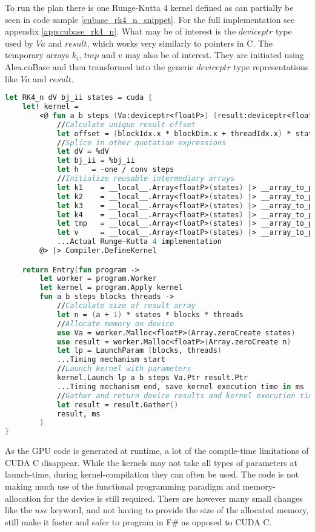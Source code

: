 To run the plan there is one Runge-Kutta 4 kernel defined as can partially be seen in code sample \ref{cubase_rk4_n_snippet}. 
For the full implementation see appendix \ref{app:cubase_rk4_n}. 
What may be of interest is the $deviceptr$ type used by $Va$ and $result$, which works very similarly to pointers in C.
The temporary arrays $k_i$, $tmp$ and $v$ may also be of interest. 
They are initiated using Alea.cuBase and then transformed into the generic $deviceptr$ type representations like $Va$ and $result$.
\clearpage
\begin{lstlisting}[language=FSharp, caption=The Runge-Kutta 4 solver expressed in F\# Alea.cuBase, label=cubase_rk4_n_snippet]
let RK4_n dV bj_ii states = cuda {
	let! kernel =
		<@ fun a b steps (Va:deviceptr<floatP>) (result:deviceptr<floatP>) ->
			//Calculate unique result offset
			let offset = (blockIdx.x * blockDim.x + threadIdx.x) * states * (a + 1)
            //Splice in other quotation expressions
			let dV = %dV
			let bj_ii = %bj_ii
			let h   = -one / conv steps
			//Initialize reusable intermediary arrays
			let k1	  = __local__.Array<floatP>(states) |> __array_to_ptr
			let k2	  = __local__.Array<floatP>(states) |> __array_to_ptr
			let k3	  = __local__.Array<floatP>(states) |> __array_to_ptr
			let k4	  = __local__.Array<floatP>(states) |> __array_to_ptr
			let tmp	  = __local__.Array<floatP>(states) |> __array_to_ptr
			let v	  = __local__.Array<floatP>(states) |> __array_to_ptr
            ...Actual Runge-Kutta 4 implementation
        @> |> Compiler.DefineKernel 

    return Entry(fun program ->
        let worker = program.Worker
        let kernel = program.Apply kernel
        fun a b steps blocks threads ->
            //Calculate size of result array
            let n = (a + 1) * states * blocks * threads
            //Allocate memory on device
            use Va = worker.Malloc<floatP>(Array.zeroCreate states)
            use result = worker.Malloc<floatP>(Array.zeroCreate n)
            let lp = LaunchParam (blocks, threads)
            ...Timing mechanism start
            //Launch kernel with parameters
            kernel.Launch lp a b steps Va.Ptr result.Ptr
            ...Timing mechanism end, save kernel execution time in ms
            //Gather and return device results and kernel execution time
            let result = result.Gather()
            result, ms
        )
}
\end{lstlisting}

As the GPU code is generated at runtime, a lot of the compile-time limitations of CUDA C disappear.
While the kernels may not take all types of parameters at launch-time, during kernel-compilation they can often be used.
The code is not making much use of the functional programming paradigm and memory-allocation for the device is still required.
There are however many small changes like the $use$ keyword, and not having to provide the size of the allocated memory, still make it faster and safer to program in F\# as opposed to CUDA C.


